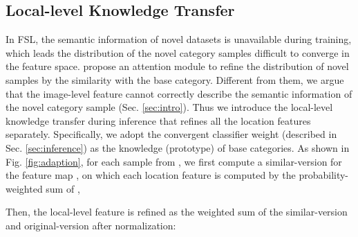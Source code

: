 \documentclass{article}
\begin{document}
\subsection{Local-level Knowledge Transfer}
\label{sec:adaption}
In FSL, the semantic information of novel datasets is unavailable during training, which leads the distribution of the novel category samples difficult to converge in the feature space. \cite{gidaris2018dynamic, liu2019large} propose an attention module to refine the distribution of novel samples by the similarity with the base category. Different from them, we argue that the image-level feature cannot correctly describe the semantic information of the novel category sample (Sec. \ref{sec:intro}).
Thus we introduce the local-level knowledge transfer during inference that refines all the location features separately. Specifically, we adopt the convergent classifier weight  (described in Sec. \ref{sec:inference}) as the knowledge (prototype) of base categories. As shown in Fig. \ref{fig:adaption}, for each sample from , we first compute a  similar-version  for the feature map , on which each location feature is computed by the probability-weighted sum of , 

Then, the local-level feature is refined as the weighted sum of the similar-version and original-version after normalization:
\end{document}

